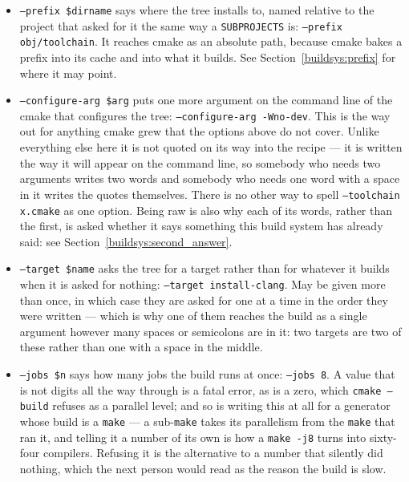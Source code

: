 \documentclass{article}
\begin{document}
\begin{itemize}
  The whole thing is handed over as one argument however many spaces
  or semicolons are in it, since a cmake list is semicolon-separated
  and a semicolon in a recipe would otherwise end the command: the
  second of those is one variable holding a list of two.  \texttt{\$var:\$type=\$value} works too, being just another
  spelling of the same argument.  A value with no \texttt{=} in it is
  a fatal error, and so is one with no \texttt{\$var} in front of the
  \texttt{=} or the \texttt{:}, which cmake would refuse as a parse
  error only once the tree was being configured.

\item \texttt{--prefix \$dirname} says where the tree installs to,
  named relative to the project that asked for it the same way a
  \texttt{SUBPROJECTS} is: \texttt{--prefix obj/toolchain}.  It
  reaches cmake as an absolute path, because cmake bakes a prefix into
  its cache and into what it builds.  See
  Section~\ref{buildsys:prefix} for where it may point.

\item \texttt{--configure-arg \$arg} puts one more argument on the
  command line of the cmake that configures the tree:
  \texttt{--configure-arg -Wno-dev}.  This is the way out for anything
  cmake grew that the options above do not cover.  Unlike everything
  else here it is not quoted on its way into the recipe --- it is
  written the way it will appear on the command line, so somebody who
  needs two arguments writes two words and somebody who needs one word
  with a space in it writes the quotes themselves.  There is no other
  way to spell \texttt{--toolchain x.cmake} as one option.  Being raw
  is also why each of its words, rather than the first, is asked
  whether it says something this build system has already said: see
  Section~\ref{buildsys:second_answer}.

\item \texttt{--target \$name} asks the tree for a target rather than
  for whatever it builds when it is asked for nothing:
  \texttt{--target install-clang}.  May be given more than once, in
  which case they are asked for one at a time in the order they were
  written --- which is why one of them reaches the build as a single
  argument however many spaces or semicolons are in it: two targets
  are two of these rather than one with a space in the middle.

\item \texttt{--jobs \$n} says how many jobs the build runs at once:
  \texttt{--jobs 8}.  A value that is not digits all the way through
  is a fatal error, as is a zero, which \texttt{cmake --build} refuses
  as a parallel level; and so is writing this at all for a generator
  whose build is a \texttt{make} --- a sub-\texttt{make} takes its
  parallelism from the \texttt{make} that ran it, and telling it a
  number of its own is how a \texttt{make -j8} turns into sixty-four
  compilers.  Refusing it is the alternative to a number that silently
  did nothing, which the next person would read as the reason the
  build is slow.


\end{itemize}
\end{document}
